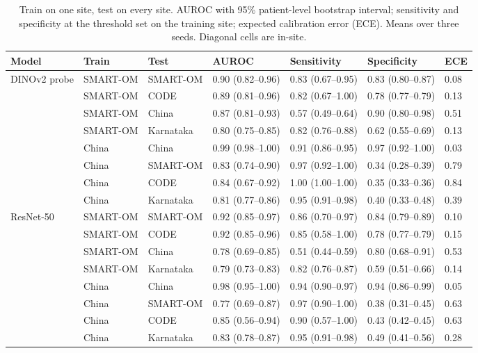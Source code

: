 \documentclass[11pt]{article}
\begin{document}
\begin{table}[t]
\centering
\caption{Train on one site, test on every site. AUROC with 95\% patient-level bootstrap interval; sensitivity and specificity at the threshold set on the training site; expected calibration error (ECE). Means over three seeds. Diagonal cells are in-site.}
\label{tab:matrix}
\footnotesize
\setlength{\tabcolsep}{4pt}
\begin{tabular}{lllllll}
\toprule
Model & Train & Test & AUROC & Sensitivity & Specificity & ECE \\
\midrule
\multirow{8}{*}{DINOv2 probe}
 & SMART-OM & SMART-OM & 0.90 (0.82--0.96) & 0.83 (0.67--0.95) & 0.83 (0.80--0.87) & 0.08 \\
 & SMART-OM & CODE & 0.89 (0.81--0.96) & 0.82 (0.67--1.00) & 0.78 (0.77--0.79) & 0.13 \\
 & SMART-OM & China & 0.87 (0.81--0.93) & 0.57 (0.49--0.64) & 0.90 (0.80--0.98) & 0.51 \\
 & SMART-OM & Karnataka & 0.80 (0.75--0.85) & 0.82 (0.76--0.88) & 0.62 (0.55--0.69) & 0.13 \\
 & China & China & 0.99 (0.98--1.00) & 0.91 (0.86--0.95) & 0.97 (0.92--1.00) & 0.03 \\
 & China & SMART-OM & 0.83 (0.74--0.90) & 0.97 (0.92--1.00) & 0.34 (0.28--0.39) & 0.79 \\
 & China & CODE & 0.84 (0.67--0.92) & 1.00 (1.00--1.00) & 0.35 (0.33--0.36) & 0.84 \\
 & China & Karnataka & 0.81 (0.77--0.86) & 0.95 (0.91--0.98) & 0.40 (0.33--0.48) & 0.39 \\
\midrule
\multirow{8}{*}{ResNet-50}
 & SMART-OM & SMART-OM & 0.92 (0.85--0.97) & 0.86 (0.70--0.97) & 0.84 (0.79--0.89) & 0.10 \\
 & SMART-OM & CODE & 0.92 (0.85--0.96) & 0.85 (0.58--1.00) & 0.78 (0.77--0.79) & 0.15 \\
 & SMART-OM & China & 0.78 (0.69--0.85) & 0.51 (0.44--0.59) & 0.80 (0.68--0.91) & 0.53 \\
 & SMART-OM & Karnataka & 0.79 (0.73--0.83) & 0.82 (0.76--0.87) & 0.59 (0.51--0.66) & 0.14 \\
 & China & China & 0.98 (0.95--1.00) & 0.94 (0.90--0.97) & 0.94 (0.86--0.99) & 0.05 \\
 & China & SMART-OM & 0.77 (0.69--0.87) & 0.97 (0.90--1.00) & 0.38 (0.31--0.45) & 0.63 \\
 & China & CODE & 0.85 (0.56--0.94) & 0.90 (0.57--1.00) & 0.43 (0.42--0.45) & 0.63 \\
 & China & Karnataka & 0.83 (0.78--0.87) & 0.95 (0.91--0.98) & 0.49 (0.41--0.56) & 0.28 \\
\bottomrule
\end{tabular}
\end{table}
\end{document}
